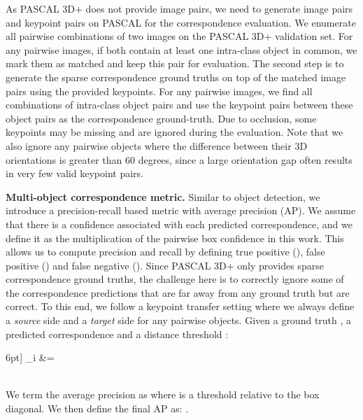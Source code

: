 As PASCAL 3D+ does not provide image pairs, we need to generate image pairs and keypoint pairs on PASCAL for the correspondence evaluation. We enumerate all pairwise combinations of two images on the PASCAL 3D+ validation set. For any pairwise images, if both contain at least one intra-class object in common, we mark them as matched and keep this pair for evaluation. The second step is to generate the sparse correspondence ground truths on top of the matched image pairs using the provided keypoints. For any pairwise images, we find all combinations of intra-class object pairs and use the keypoint pairs between these object pairs as the correspondence ground-truth. Due to occlusion, some keypoints may be missing and are ignored during the evaluation. Note that we also ignore any pairwise objects where the difference between their 3D orientations is greater than 60 degrees, since a large orientation gap often results in very few valid keypoint pairs.

\textbf{Multi-object correspondence metric.} Similar to object detection, we introduce a precision-recall based metric with average precision (AP). We assume that there is a confidence associated with each predicted correspondence, and we define it as the multiplication of the pairwise box confidence in this work. This allows us to compute precision and recall by defining true positive (), false positive () and false negative (). Since PASCAL 3D+ only provides sparse correspondence ground truths, the challenge here is to correctly ignore some of the correspondence predictions that are far away from any ground truth but are correct. To this end, we follow a keypoint transfer setting where we always define a \textit{source} side  and a \textit{target} side  for any pairwise objects. Given a ground truth , a predicted correspondence  and a distance threshold :

\begin{small}
\vspace{-0.2cm}
6pt]
    _i &= \
\end{small}\\
We term the average precision as  where  is a threshold relative to the box diagonal. We then define the final AP as: .



